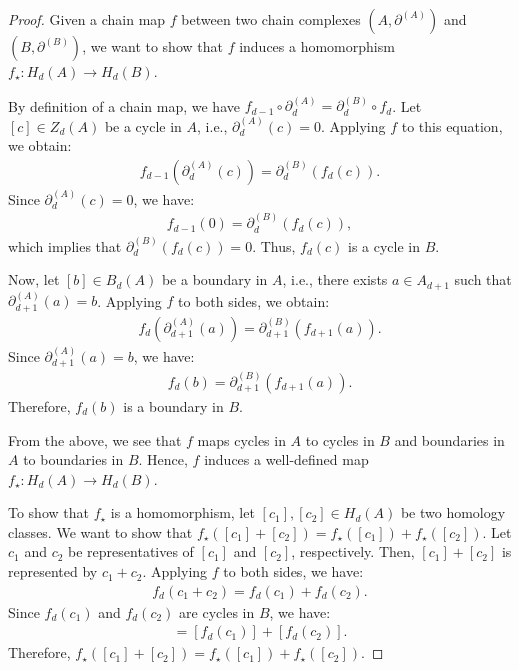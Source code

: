 \begin{proof}
	Given a chain map \( f \) between two chain complexes \( (A, \partial^{(A)}) \) and \( (B, \partial^{(B)}) \), we want to show that \( f \) induces a homomorphism \( f_{\star}: H_{d}(A) \rightarrow H_{d}(B) \).
			
	By definition of a chain map, we have \( f_{d-1} \circ \partial^{(A)}_d = \partial^{(B)}_d \circ f_d \). Let \([c] \in Z_{d}(A)\) be a cycle in \( A \), i.e., \( \partial^{(A)}_{d}(c) = 0 \). Applying \( f \) to this equation, we obtain:
	\begin{align}
		f_{d-1}(\partial^{(A)}_{d}(c)) = \partial^{(B)}_{d}(f_{d}(c)). 
	\end{align}
	Since \( \partial^{(A)}_{d}(c) = 0 \), we have:
	\begin{align}
		f_{d-1}(0) = \partial^{(B)}_{d}(f_{d}(c)), 
	\end{align}
	which implies that \( \partial^{(B)}_{d}(f_{d}(c)) = 0 \). Thus, \( f_{d}(c) \) is a cycle in \( B \).
			
	Now, let \([b] \in B_{d}(A) \) be a boundary in \( A \), i.e., there exists \( a \in A_{d+1} \) such that \( \partial^{(A)}_{d+1}(a) = b \). Applying \( f \) to both sides, we obtain:
	\begin{align}
		f_{d}(\partial^{(A)}_{d+1}(a)) = \partial^{(B)}_{d+1}(f_{d+1}(a)). 
	\end{align}
	Since \( \partial^{(A)}_{d+1}(a) = b \), we have:
	\begin{align}
		f_{d}(b) = \partial^{(B)}_{d+1}(f_{d+1}(a)). 
	\end{align}
	Therefore, \( f_{d}(b) \) is a boundary in \( B \).
			
	From the above, we see that \( f \) maps cycles in \( A \) to cycles in \( B \) and boundaries in \( A \) to boundaries in \( B \). Hence, \( f \) induces a well-defined map \( f_{\star}: H_{d}(A) \rightarrow H_{d}(B) \).
			
	To show that \( f_{\star} \) is a homomorphism, let \([c_{1}], [c_{2}] \in H_{d}(A) \) be two homology classes. We want to show that \( f_{\star}([c_{1}] + [c_{2}]) = f_{\star}([c_{1}]) + f_{\star}([c_{2}]) \). Let \( c_{1} \) and \( c_{2} \) be representatives of \([c_{1}]\) and \([c_{2}]\), respectively. Then, \([c_{1}] + [c_{2}]\) is represented by \( c_{1} + c_{2} \). Applying \( f \) to both sides, we have:
	\begin{align}
		f_{d}(c_{1} + c_{2}) = f_{d}(c_{1}) + f_{d}(c_{2}). 
	\end{align}
	Since \( f_{d}(c_{1}) \) and \( f_{d}(c_{2}) \) are cycles in \( B \), we have:
	\begin{align}
		[f_{d}(c_{1} + c_{2})] = [f_{d}(c_{1})] + [f_{d}(c_{2})]. 
	\end{align}
	Therefore, \( f_{\star}([c_{1}] + [c_{2}]) = f_{\star}([c_{1}]) + f_{\star}([c_{2}]) \).
\end{proof}

